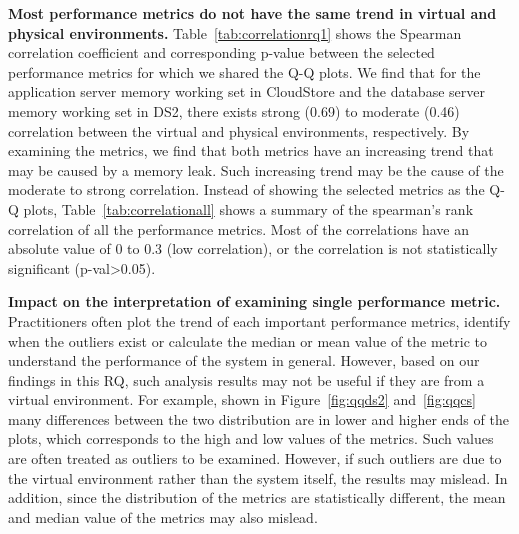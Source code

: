 \documentclass[smallextended]{svjour3}       %
\begin{document}
\textbf{Most performance metrics do not have the same trend in virtual and physical environments.} Table~\ref{tab:correlationrq1} shows the Spearman correlation coefficient and corresponding p-value between the selected performance metrics for which we shared the Q-Q plots. We find that for the application server memory working set in CloudStore and the database server memory working set in DS2, there exists strong (0.69) to moderate (0.46) correlation between the virtual and physical environments, respectively. By examining the metrics, we find that both metrics have an increasing trend that may be caused by a memory leak. Such increasing trend may be the cause of the moderate to strong correlation. Instead of showing the selected metrics as the Q-Q plots, Table~\ref{tab:correlationall} shows a summary of the spearman's rank correlation of all the performance metrics. Most of the correlations have an absolute value of 0 to 0.3 (low correlation), or the correlation is not statistically significant (p-val\textgreater0.05).

\textbf{Impact on the interpretation of examining single performance metric.} Practitioners often plot the trend of each important performance metrics, identify when the outliers exist or calculate the median or mean value of the metric to understand the performance of the system in general. However, based on our findings in this RQ, such analysis results may not be useful if they are from a virtual environment. For example, shown in Figure~\ref{fig:qqds2} and~\ref{fig:qqcs} many differences between the two distribution are in lower and higher ends of the plots, which corresponds to the high and low values of the metrics. Such values are often treated as outliers to be examined. However, if such outliers are due to the virtual environment rather than the system itself, the results may mislead. In addition, since the distribution of the metrics are statistically different, the mean and median value of the metrics may also mislead. 

\noindent{}
\end{document}
